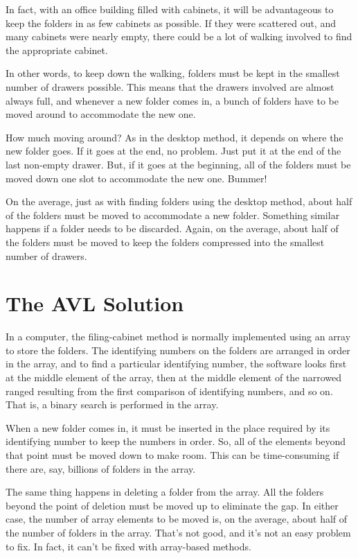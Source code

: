 In fact, with an office building filled with cabinets, it will be
advantageous to keep the folders in as few cabinets as possible. If
they were scattered out, and many cabinets were nearly empty, there
could be a lot of walking involved to find the appropriate cabinet.

In other words, to keep down the walking, folders must be kept in
the smallest number of drawers possible. This means that the drawers
involved are almost always full, and whenever a new folder comes in,
a bunch of folders have to be moved around to accommodate the new
one.

How much moving around? As in the desktop method, it depends on
where the new folder goes. If it goes at the end, no problem. Just
put it at the end of the last non-empty drawer. But, if it goes at
the beginning, all of the folders must be moved down one slot to
accommodate the new one. Bummer!

On the average, just as with finding folders using the desktop
method, about half of the folders must be moved to accommodate a new
folder. Something similar happens if a folder needs to be discarded.
Again, on the average, about half of the folders must be moved to
keep the folders compressed into the smallest number of drawers.

\section{The AVL Solution}

In a computer, the filing-cabinet method is normally implemented
using an array to store the folders. The identifying numbers on the
folders are arranged in order in the array, and to find a particular
identifying number, the software looks first at the middle element
of the array, then at the middle element of the narrowed ranged
resulting from the first comparison of identifying numbers, and so
on. That is, a binary search is performed in the array.

When a new folder comes in, it must be inserted in the
place required by its identifying number to keep the numbers
in order. So, all of the elements beyond that point
must be moved down to make room. This can be time-consuming if there
are, say, billions of folders in the array.

The same thing happens in deleting a folder from the array. All the
folders beyond the point of deletion must be moved up to eliminate
the gap. In either case, the number of array elements to be moved
is, on the average, about half of the number of folders in the array.
That's not good, and it's not an easy problem to fix.
In fact, it can't be fixed with array-based methods.

